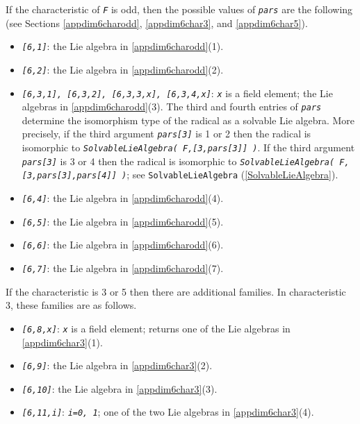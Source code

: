 \documentclass[a4paper,11pt]{report}
\begin{document}
{{{\begin{itemize}
\end{itemize}
 If the characteristic of \mbox{\texttt{\slshape F}} is odd, then the possible values of \mbox{\texttt{\slshape pars}} are the following (see Sections \ref{appdim6charodd}, \ref{appdim6char3}, and \ref{appdim6char5}). 
\begin{itemize}
\item  \mbox{\texttt{\slshape [6,1]}}: the Lie algebra in \ref{appdim6charodd}(1).
\item  \mbox{\texttt{\slshape [6,2]}}: the Lie algebra in \ref{appdim6charodd}(2).
\item \mbox{\texttt{\slshape [6,3,1], [6,3,2], [6,3,3,x], [6,3,4,x]}}: \mbox{\texttt{\slshape x}} is a field element; the Lie algebras in \ref{appdim6charodd}(3). The third and fourth entries of \mbox{\texttt{\slshape pars}} determine the isomorphism type of the radical as a solvable Lie algebra. More
precisely, if the third argument \mbox{\texttt{\slshape pars[3]}} is 1 or 2 then the radical is isomorphic to \mbox{\texttt{\slshape SolvableLieAlgebra( F,[3,pars[3]] )}}. If the third argument \mbox{\texttt{\slshape pars[3]}} is 3 or 4 then the radical is isomorphic to \mbox{\texttt{\slshape SolvableLieAlgebra( F,[3,pars[3],pars[4]] )}}; see \texttt{SolvableLieAlgebra} (\ref{SolvableLieAlgebra}). 
\item \mbox{\texttt{\slshape [6,4]}}: the Lie algebra in \ref{appdim6charodd}(4).
\item \mbox{\texttt{\slshape [6,5]}}: the Lie algebra in \ref{appdim6charodd}(5).
\item \mbox{\texttt{\slshape [6,6]}}: the Lie algebra in \ref{appdim6charodd}(6).
\item \mbox{\texttt{\slshape [6,7]}}: the Lie algebra in \ref{appdim6charodd}(7).
\end{itemize}
 If the characteristic is 3 or 5 then there are additional families. In
characteristic 3, these families are as follows. 
\begin{itemize}
\item  \mbox{\texttt{\slshape [6,8,x]}}: \mbox{\texttt{\slshape x}} is a field element; returns one of the Lie algebras in \ref{appdim6char3}(1).
\item \mbox{\texttt{\slshape [6,9]}}: the Lie algebra in \ref{appdim6char3}(2).
\item \mbox{\texttt{\slshape [6,10]}}: the Lie algebra in \ref{appdim6char3}(3).
\item \mbox{\texttt{\slshape [6,11,i]}}: \mbox{\texttt{\slshape i=0, 1}}; one of the two Lie algebras in \ref{appdim6char3}(4). 

\end{itemize}}}}
\end{document}
